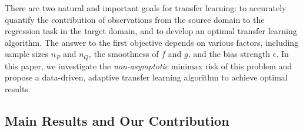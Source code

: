 \documentclass{article}
\begin{document}
There are two natural and important goals for  transfer learning: to accurately quantify the contribution of observations from the source domain to the regression task in the target domain, and to develop an optimal transfer learning algorithm. The answer to the first objective depends on various factors, including sample sizes $n_P$ and $n_Q$, the smoothness of $f$ and $g$, and the bias strength $\epsilon$. In this paper, we investigate the \emph{non-asymptotic} minimax risk of this problem and propose a data-driven, adaptive transfer learning algorithm to achieve optimal results.


\subsection{Main Results and Our Contribution}
\end{document}
